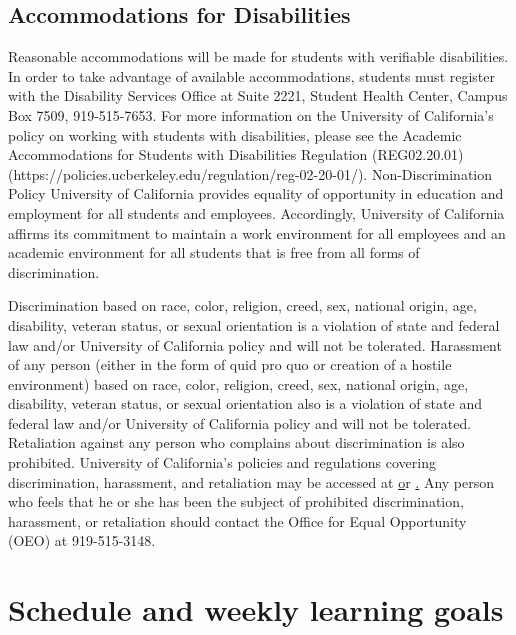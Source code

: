 \documentclass[11pt]{article}
\begin{document}
\subsection*{Accommodations for Disabilities}
\footnotesize{Reasonable accommodations will be made for students with verifiable disabilities. In order to take advantage of available accommodations, students must register with the Disability Services Office at Suite 2221, Student Health Center, Campus Box 7509, 919-515-7653. For more information on the University of California's policy on working with students with disabilities, please see the Academic Accommodations for Students with Disabilities Regulation (REG02.20.01) (https://policies.ucberkeley.edu/regulation/reg-02-20-01/).
Non-Discrimination Policy University of California provides equality of opportunity in education and employment for all students and employees. Accordingly, University of California affirms its commitment to maintain a work environment for all employees and an academic environment for all students that is free from all forms of discrimination.}

\footnotesize{Discrimination based on race, color, religion, creed, sex, national origin, age, disability, veteran status, or sexual orientation is a violation of state and federal law and/or University of California policy and will not be tolerated. Harassment of any person (either in the form of quid pro quo or creation of a hostile environment) based on race, color, religion, creed, sex, national origin, age, disability, veteran status, or sexual orientation also is a violation of state and federal law and/or University of California policy and will not be tolerated. Retaliation against any person who complains about discrimination is also prohibited. University of California's policies and regulations covering discrimination, harassment, and retaliation may be accessed at \href{http://policies.ucberkeley.edu/policy/pol-04-25-05} or  \href{http://www.ucberkeley.edu/equal_op/}. Any person who feels that he or she has been the subject of prohibited discrimination, harassment, or retaliation should contact the Office for Equal Opportunity (OEO) at 919-515-3148.}


\newpage
\section*{Schedule and weekly learning goals}
\end{document}
